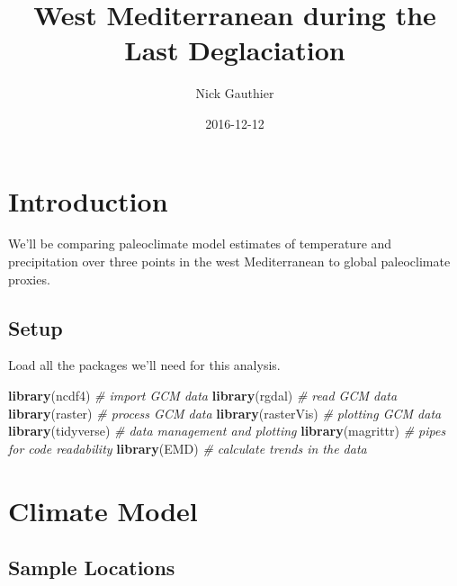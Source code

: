 \documentclass[11pt,]{tufte-handout}
\title{West Mediterranean during the Last Deglaciation}
\author{Nick Gauthier}
\date{2016-12-12}
\newenvironment{Shaded}{}{}
\newcommand{\KeywordTok}[1]{\textcolor[rgb]{0.00,0.44,0.13}{\textbf{{#1}}}}
\newcommand{\CommentTok}[1]{\textcolor[rgb]{0.38,0.63,0.69}{\textit{{#1}}}}
\newcommand{\NormalTok}[1]{{#1}}
\begin{document}
\maketitle




\section{Introduction}\label{introduction}

We'll be comparing paleoclimate model estimates of temperature and
precipitation over three points in the west Mediterranean to global
paleoclimate proxies.

\subsection{Setup}\label{setup}

Load all the packages we'll need for this analysis.


\begin{Shaded}
\begin{Highlighting}[]
\KeywordTok{library}\NormalTok{(ncdf4) }\CommentTok{# import GCM data}
\KeywordTok{library}\NormalTok{(rgdal) }\CommentTok{# read GCM data}
\KeywordTok{library}\NormalTok{(raster) }\CommentTok{# process GCM data}
\KeywordTok{library}\NormalTok{(rasterVis) }\CommentTok{# plotting GCM data}
\KeywordTok{library}\NormalTok{(tidyverse) }\CommentTok{# data management and plotting}
\KeywordTok{library}\NormalTok{(magrittr) }\CommentTok{# pipes for code readability}
\KeywordTok{library}\NormalTok{(EMD) }\CommentTok{# calculate trends in the data}
\end{Highlighting}
\end{Shaded}

\section{Climate Model}\label{climate-model}

\subsection{Sample Locations}\label{sample-locations}
\end{document}
